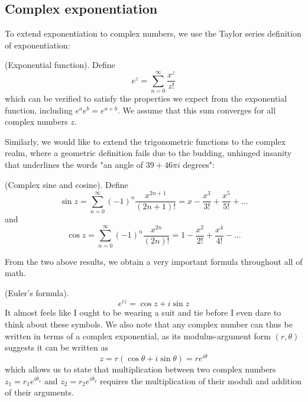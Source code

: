 \documentclass{article}
\begin{document}
\subsection{Complex exponentiation}
To extend exponentiation to complex numbers, we use the Taylor series definition of exponentiation:
\begin{definition}
    (Exponential function). Define
    \begin{equation*}
        e^z=\sum_{n=0}^{\infty}\frac{x^z}{z!}
    \end{equation*}
    which can be verified to satisfy the properties we expect from the exponential function, including $e^{a}e^{b}=e^{a+b}$. We assume that this sum converges for all complex numbers $z$.
\end{definition}
Similarly, we would like to extend the trigonometric functions to the complex realm, where a geometric definition fails due to the budding, unhinged insanity that underlines the words "an angle of $39+46\pi i$ degrees":
\begin{definition}
    (Complex sine and cosine). Define
    \begin{equation*}
        \sin z = \sum_{n=0}^{\infty} (-1)^{n}\frac{x^{2n+1}}{(2n+1)!} = x-\frac{x^3}{3!}+\frac{x^5}{5!}+...
    \end{equation*}
    and 
    \begin{equation*}
        \cos z = \sum_{n=0}^{\infty} (-1)^{n}\frac{x^{2n}}{(2n)!} = 1-\frac{x^2}{2!}+\frac{x^4}{4!}-...
    \end{equation*}
\end{definition}
From the two above results, we obtain a very important formula throughout all of math.
\begin{theorem}
    (Euler's formula). 
    \begin{equation*}
        e^{iz}=\cos z + i\sin z
    \end{equation*}
    It almost feels like I ought to be wearing a suit and tie before I even dare to think about these symbols. We also note that any complex number can thus be written in terms of a complex exponential, as its modulus-argument form $(r,\theta)$ suggests it can be written as 
    \begin{equation*}
        z=r(\cos \theta + i\sin \theta)=re^{i\theta}
    \end{equation*}
    which allows us to state that multiplication between two complex numbers $z_1=r_1e^{i\theta_1}$ and $z_2=r_2e^{i\theta_2}$ requires the multiplication of their moduli and addition of their arguments.
\end{theorem}
\end{document}
